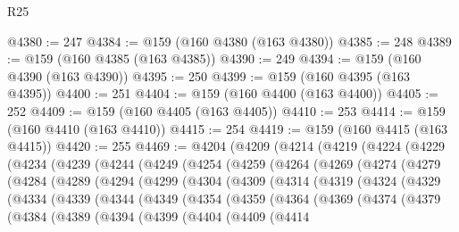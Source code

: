 \begin{lexlean}{R25}
\begin{coremodule}
@4380 := 247
@4384 := @159 (@160 @4380 (@163 @4380))
@4385 := 248
@4389 := @159 (@160 @4385 (@163 @4385))
@4390 := 249
@4394 := @159 (@160 @4390 (@163 @4390))
@4395 := 250
@4399 := @159 (@160 @4395 (@163 @4395))
@4400 := 251
@4404 := @159 (@160 @4400 (@163 @4400))
@4405 := 252
@4409 := @159 (@160 @4405 (@163 @4405))
@4410 := 253
@4414 := @159 (@160 @4410 (@163 @4410))
@4415 := 254
@4419 := @159 (@160 @4415 (@163 @4415))
@4420 := 255
@4469 := @4204
    (@4209
      (@4214
        (@4219
          (@4224
            (@4229
              (@4234
                (@4239
                  (@4244
                    (@4249
                      (@4254
                        (@4259
                          (@4264
                            (@4269
                              (@4274
                                (@4279
                                  (@4284
                                    (@4289
                                      (@4294
                                        (@4299
                                          (@4304
                                            (@4309
                                              (@4314
                                                (@4319
                                                  (@4324
                                                    (@4329
                                                      (@4334
                                                        (@4339
                                                          (@4344
                                                            (@4349
                                                              (@4354
                                                                (@4359
                                                                  (@4364
                                                                    (@4369
                                                                      (@4374
                                                                        (@4379
                                                                          (@4384
                                                                            (@4389
                                                                              (@4394
                                                                                (@4399
                                                                                  (@4404
                                                                                    (@4409
                                                                                      (@4414

\end{coremodule}
\end{lexlean}

